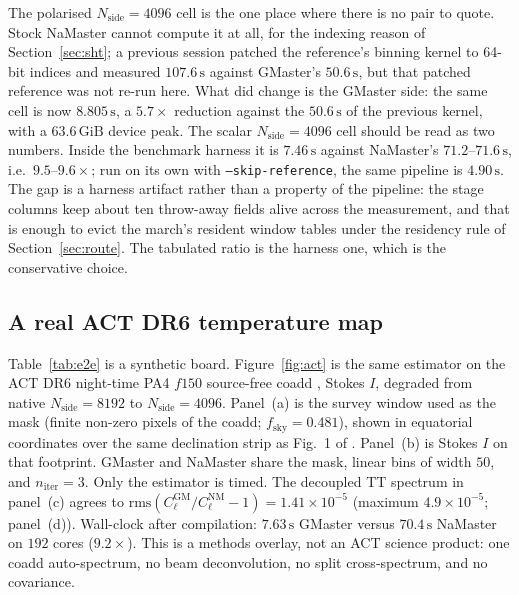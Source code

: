 \documentclass[usenatbib,useAMS]{mnras}
\begin{document}
The polarised $N_{\mathrm{side}}=4096$ cell is the one place where there is no pair to quote. Stock NaMaster cannot compute it at all, for the indexing reason of Section~\ref{sec:sht}; a previous session patched the reference's binning kernel to 64-bit indices and measured $107.6\,\mathrm{s}$ against GMaster's $50.6\,\mathrm{s}$, but that patched reference was not re-run here. What did change is the GMaster side: the same cell is now $8.805\,\mathrm{s}$, a $5.7\times$ reduction against the $50.6\,\mathrm{s}$ of the previous kernel, with a $63.6\,\mathrm{GiB}$ device peak. The scalar $N_{\mathrm{side}}=4096$ cell should be read as two numbers. Inside the benchmark harness it is $7.46\,\mathrm{s}$ against NaMaster's $71.2$--$71.6\,\mathrm{s}$, i.e.\ $9.5$--$9.6\times$; run on its own with \texttt{--skip-reference}, the same pipeline is $4.90\,\mathrm{s}$. The gap is a harness artifact rather than a property of the pipeline: the stage columns keep about ten throw-away fields alive across the measurement, and that is enough to evict the march's resident window tables under the residency rule of Section~\ref{sec:route}. The tabulated ratio is the harness one, which is the conservative choice.

\subsection{A real ACT DR6 temperature map}
\label{sec:act}

Table~\ref{tab:e2e} is a synthetic board. Figure~\ref{fig:act} is the same estimator on the ACT DR6 night-time PA4 $f150$ source-free coadd \citep{naess2025}, Stokes $I$, degraded from native $N_{\mathrm{side}}=8192$ to $N_{\mathrm{side}}=4096$. Panel~(a) is the survey window used as the mask (finite non-zero pixels of the coadd; $f_{\mathrm{sky}}=0.481$), shown in equatorial coordinates over the same declination strip as Fig.~1 of \citet{naess2025}. Panel~(b) is Stokes $I$ on that footprint. GMaster and NaMaster share the mask, linear bins of width $50$, and $n_{\mathrm{iter}}=3$. Only the estimator is timed. The decoupled TT spectrum in panel~(c) agrees to $\mathrm{rms}(C_\ell^{\mathrm{GM}}/C_\ell^{\mathrm{NM}}-1)=1.41\times10^{-5}$ (maximum $4.9\times10^{-5}$; panel~(d)). Wall-clock after compilation: $7.63\,\mathrm{s}$ GMaster versus $70.4\,\mathrm{s}$ NaMaster on $192$ cores ($9.2\times$). This is a methods overlay, not an ACT science product: one coadd auto-spectrum, no beam deconvolution, no split cross-spectrum, and no covariance.
\end{document}
